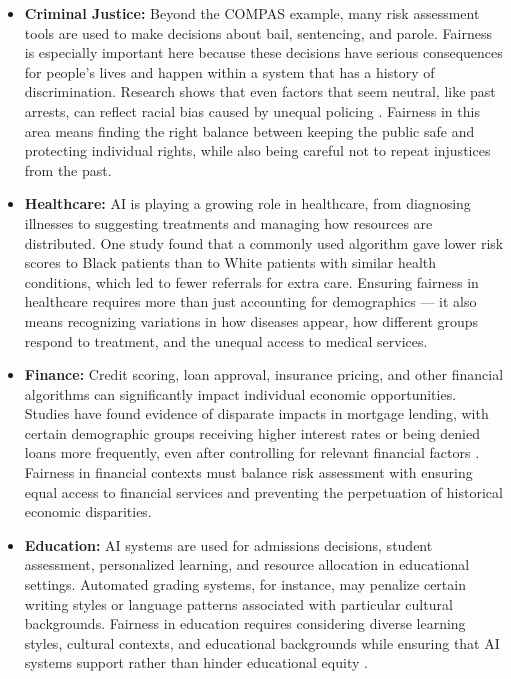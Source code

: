 \documentclass[12pt,a4paper,openright,twoside]{book}
\begin{document}
\begin{itemize}
    \item\textbf{Criminal Justice:} Beyond the COMPAS example, many risk assessment tools are used to make decisions about bail, sentencing, and parole. Fairness is especially important here because these decisions have serious consequences for people’s lives and happen within a system that has a history of discrimination. Research shows that even factors that seem neutral, like past arrests, can reflect racial bias caused by unequal policing \cite{berk2017fairness, ensign2018runaway}. Fairness in this area means finding the right balance between keeping the public safe and protecting individual rights, while also being careful not to repeat injustices from the past.
    
    \item \textbf{Healthcare:} AI is playing a growing role in healthcare, from diagnosing illnesses to suggesting treatments and managing how resources are distributed. One study \cite{obermeyer2019dissecting} found that a commonly used algorithm gave lower risk scores to Black patients than to White patients with similar health conditions, which led to fewer referrals for extra care. Ensuring fairness in healthcare requires more than just accounting for demographics — it also means recognizing variations in how diseases appear, how different groups respond to treatment, and the unequal access to medical services.
    
    \item \textbf{Finance:} Credit scoring, loan approval, insurance pricing, and other financial algorithms can significantly impact individual economic opportunities. Studies have found evidence of disparate impacts in mortgage lending, with certain demographic groups receiving higher interest rates or being denied loans more frequently, even after controlling for relevant financial factors \cite{bartlett2022consumer}. Fairness in financial contexts must balance risk assessment with ensuring equal access to financial services and preventing the perpetuation of historical economic disparities.
    
    \item \textbf{Education:} AI systems are used for admissions decisions, student assessment, personalized learning, and resource allocation in educational settings. Automated grading systems, for instance, may penalize certain writing styles or language patterns associated with particular cultural backgrounds. Fairness in education requires considering diverse learning styles, cultural contexts, and educational backgrounds while ensuring that AI systems support rather than hinder educational equity \cite{mehrabi2021survey}.
    

\end{itemize}
\end{document}
